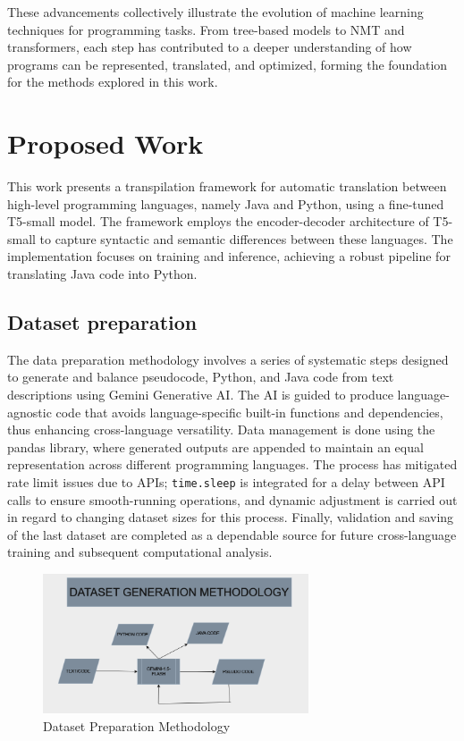 \documentclass{dhbenelux}
\begin{document}
These advancements collectively illustrate the evolution of machine learning techniques for programming tasks. From tree-based models to NMT and transformers, each step has contributed to a deeper understanding of how programs can be represented, translated, and optimized, forming the foundation for the methods explored in this work.


\section{Proposed Work}

This work presents a transpilation framework for automatic translation between high-level programming languages, namely Java and Python, using a fine-tuned T5-small model. The framework employs the encoder-decoder architecture of T5-small to capture syntactic and semantic differences between these languages. The implementation focuses on training and inference, achieving a robust pipeline for translating Java code into Python.

\subsection{Dataset preparation}
The data preparation methodology involves a series of systematic steps designed to generate and balance pseudocode, Python, and Java code from text descriptions using Gemini Generative AI. The AI is guided to produce language-agnostic code that avoids language-specific built-in functions and dependencies, thus enhancing cross-language versatility. Data management is done using the pandas library, where generated outputs are appended to maintain an equal representation across different programming languages. The process has mitigated rate limit issues due to APIs; \texttt{time.sleep} is integrated for a delay between API calls to ensure smooth-running operations, and dynamic adjustment is carried out in regard to changing dataset sizes for this process. Finally, validation and saving of the last dataset are completed as a dependable source for future cross-language training and subsequent computational analysis.

\begin{figure}[h!]
\centering
\includegraphics[width=0.7\textwidth]{dataset_methodology.png} %
\caption{Dataset Preparation Methodology}
\label{fig:dataset-methodology}
\end{figure}
\end{document}
